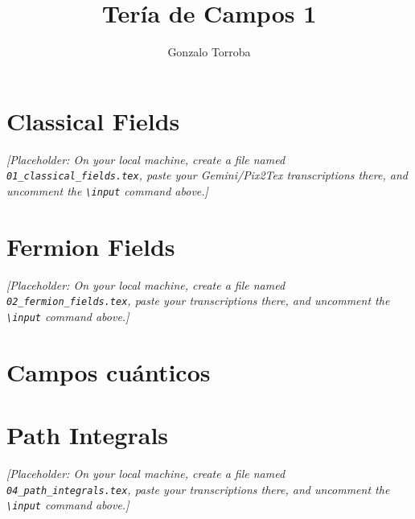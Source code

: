 \documentclass[11pt, a4paper]{article}
\title{Tería de Campos 1}
\author{Gonzalo Torroba}
\begin{document}
\maketitle
\tableofcontents
\newpage


\section{Classical Fields}
% 

\textit{[Placeholder: On your local machine, create a file named \texttt{01\_classical\_fields.tex}, paste your Gemini/Pix2Tex transcriptions there, and uncomment the \texttt{\textbackslash input} command above.]}

\newpage
\section{Fermion Fields}
% 

\textit{[Placeholder: On your local machine, create a file named \texttt{02\_fermion\_fields.tex}, paste your transcriptions there, and uncomment the \texttt{\textbackslash input} command above.]}

\newpage
\section{Campos cuánticos}



\newpage
\section{Path Integrals}
% 

\textit{[Placeholder: On your local machine, create a file named \texttt{04\_path\_integrals.tex}, paste your transcriptions there, and uncomment the \texttt{\textbackslash input} command above.]}
\end{document}
